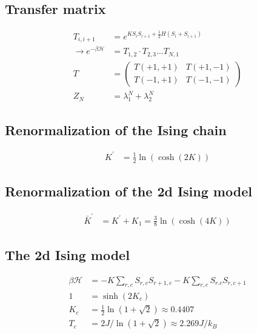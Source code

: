 \subsection*{Transfer matrix}
\begin{equation*}
    \begin{aligned}
        T_{i,i+1} &= e^{KS_iS_{i+1} + \frac{1}{2}H(S_i + S_{i+1})} \\
        \rightarrow e^{-\beta \mathcal{H}} &= T_{1,2} \cdot T_{2,3} \dots T_{N,1}\\
        T &= \begin{pmatrix}
            T(+1,+1) & T(+1,-1)  \\
            T(-1,+1) & T(-1,-1)   
            \end{pmatrix} \\
        Z_N &= \lambda_1^N + \lambda_2^N
    \end{aligned}
\end{equation*}

\subsection*{Renormalization of the Ising chain}
\begin{equation*}
    \begin{aligned}
        K^{'} &= \frac{1}{2} \ln (\cosh (2K))
    \end{aligned}
\end{equation*}

\subsection*{Renormalization of the 2d Ising model}

\begin{equation*}
    \begin{aligned}
        \bar{K}^{'} &= K^{'} + K_1 = \frac{3}{8} \ln(\cosh(4K))
    \end{aligned}
\end{equation*}

\pagebreak
\subsection*{ The 2d Ising model}
\begin{equation*}
    \begin{aligned}
        \beta \mathcal{H} &= -K\sum_{r,c} S_{r,c} S_{r+1,c} - K \sum_{r,c} S_{r.c} S_{r,c+1} \\
        1 &= \sinh(2K_c) \\
        K_c &= \frac{1}{2} \ln \left(1+ \sqrt{2}\right) \approx 0.4407 \\
        T_c &= 2J / \ln \left(1 + \sqrt{2}\right) \approx 2.269 J/k_B
    \end{aligned}
\end{equation*}

